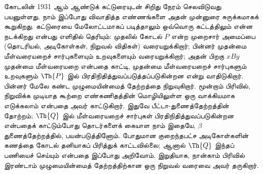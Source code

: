 \documentclass[../../../include/open-logic-section]{subfiles}
\begin{document}



கோடலின் 1931 ஆம் ஆண்டுக் கட்டுரையுடன் சிறிது நேரம் செலவிடுவது
பயனுள்ளது. நாம் இப்போது விவாதித்த எண்ணங்களை அதன் முன்னுரை
சுருக்கமாகக் கூறுகிறது. கட்டுரையை மேலோட்டமாகப் படித்தாலும் ஒவ்வொரு
கட்டத்திலும் என்ன நடக்கிறது என்பது எளிதில் தெரியும்: முதலில் கோடல்
$P$ என்ற முறைசார் அமைப்பை (தொடரியல், அடிகோள்கள், நிறுவல் விதிகள்)
வரையறுக்கிறார்; பின்னர் முதன்மை மீள்வரையறைச் சார்புகளையும் உறவுகளையும்
வரையறுக்கிறார்; அதன் பிறகு $x B y$ முதன்மை மீள்வரையறை என்பதை
காட்டி, முதன்மை மீள்வரையறைச் சார்புகளும் உறவுகளும் $\Th{P}$ இல்
பிரதிநிதித்துவப்படுத்தப்படுகின்றன என்று வாதிடுகிறார். பின்னர் மேலே
கண்ட முழுமையின்மைத் தேற்றத்தை நிறுவுகிறார். மூன்றாம் பிரிவில்,
நிறுவிக்க முடியாத கூற்றை எண்கணிதத்தின் மொழியிலுள்ள ஒரு வாக்கியமாக
எடுக்கலாம் என்பதை அவர் காட்டுகிறார். இதுவே பீட்டா-துணைத்தேற்றத்தின்
தோற்றம்; $\Th{Q}$ இல் மீள்வரையறைச் சார்புகள் பிரதிநிதித்துவப்படுகின்றன
என்பதைக் காட்டும்போது தொடர்களைக் கையாள நாம் இதையே, $\beta$
துணைத்தேற்றத்தில், பயன்படுத்தினோம்.
போதுமான குறைந்தபட்ச அடிகோள்களின் கணத்தை கோடல் தனியாகப் பிரித்துக்
காட்டவில்லை; ஆனால் $\Th{Q}$ இந்தப் பணியைச் செய்யும் என்பதை இப்போது
அறிவோம். இறுதியாக, நான்காம் பிரிவில் இரண்டாம் முழுமையின்மைத்
தேற்றத்திற்கான ஒரு நிறுவல் வரைவை அவர் தருகிறார்.
\end{document}
